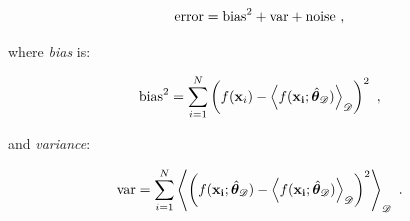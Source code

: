 \begin{equation}
	\text{error} = \text{bias}^2 + \text{var} + \text{noise} \ ,
\end{equation}

where \textit{bias} is:

\begin{equation}
	\text{bias}^2 = \sum_{i=1}^N \left(f(\vb{x}_i) - \expval{f(\vb{x_i}; \hat{\boldsymbol{\theta}}_{\mathcal{D}})}_\mathcal{D}\right)^2 \ ,
\end{equation}

and \textit{variance}:

\begin{equation}
	\text{var} = \sum_{i=1}^N \expval{\left(f(\vb{x_i}; \hat{\boldsymbol{\theta}}_{\mathcal{D}}) - \expval{f(\vb{x_i}; \hat{\boldsymbol{\theta}}_{\mathcal{D}})}_\mathcal{D}\right)^2}_\mathcal{D} \ .
\end{equation}

